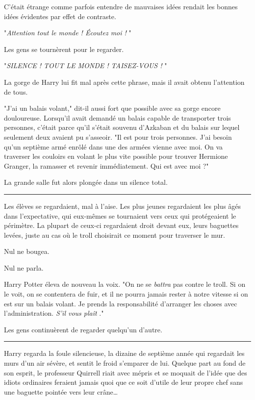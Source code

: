 C'était étrange comme parfois entendre de mauvaises idées rendait les bonnes idées évidentes par effet de contraste.

"\emph{Attention tout le monde ! Écoutez moi !} "

Les gens se tournèrent pour le regarder.

"\emph{SILENCE ! TOUT LE MONDE ! TAISEZ-VOUS !} "

La gorge de Harry lui fit mal après cette phrase, mais il avait obtenu l'attention de tous.

"J'ai un balais volant," dit-il aussi fort que possible avec sa gorge encore douloureuse. Lorsqu'il avait demandé un balais capable de transporter trois personnes, c'était parce qu'il s'était souvenu d'Azkaban et du balais sur lequel seulement deux avaient pu s'asseoir. "Il est pour trois personnes. J'ai besoin qu'un septième armé enrôlé dans une des armées vienne avec moi. On va traverser les couloirs en volant le plus vite possible pour trouver Hermione Granger, la ramasser et revenir immédiatement. Qui est avec moi ?"

La grande salle fut alors plongée dans un silence total.
\par\noindent\rule{\textwidth}{0.4pt}
Les élèves se regardaient, mal à l'aise. Les plus jeunes regardaient les plus âgés dans l'expectative, qui eux-mêmes se tournaient vers ceux qui protégeaient le périmètre. La plupart de ceux-ci regardaient droit devant eux, leurs baguettes levées, juste au cas où le troll choisirait ce moment pour traverser le mur.

Nul ne bougea.

Nul ne parla.

Harry Potter éleva de nouveau la voix. "On ne se \emph{battra}  pas contre le troll. Si on le voit, on se contentera de fuir, et il ne pourra jamais rester à notre vitesse si on est sur un balais volant. Je prends la responsabilité d'arranger les choses avec l'administration. \emph{S'il vous plaît} ."

Les gens continuèrent de regarder quelqu'un d'autre.
\par\noindent\rule{\textwidth}{0.4pt}
Harry regarda la foule silencieuse, la dizaine de septième année qui regardait les murs d'un air sévère, et sentit le froid s'emparer de lui. Quelque part au fond de son esprit, le professeur Quirrell riait avec mépris et se moquait de l'idée que des idiots ordinaires feraient jamais quoi que ce soit d'utile de leur propre chef sans une baguette pointée vers leur crâne…

